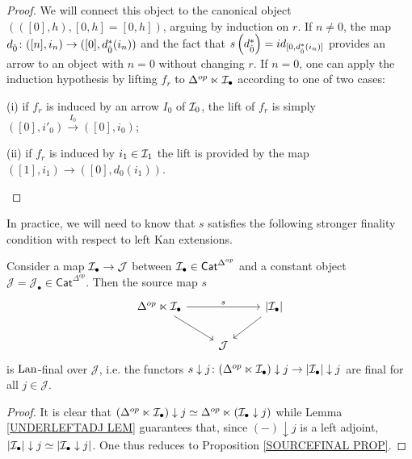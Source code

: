\documentclass[a4paper,10pt]{article}%
\begin{document}
\begin{proof}
 We will connect this object to the canonical object 
 $\left(([0],h),[0,h]=[0,h]\right)$, arguing by induction on $r$. 
If $n \neq 0$, the map 
$d_{\hat{0}} \colon ([n],i_n) \to ([0],d_{\hat{0}}^{\**}(i_n))$
 and the fact that 
$s \left(d_{\hat{0}}^{\**}\right) = id_{[0, d_{\hat{0}}^{\**}(i_n)]}$ provides an arrow to an object with $n=0$ without changing $r$.
If $n=0$, one can apply the induction hypothesis by lifting $f_r$ to $\Delta^{op} \ltimes \mathcal{I}_{\bullet}$ according to one of two cases:
\begin{inparaenum}
	\item[(i)] if $f_r$ is induced by an arrow $I_0$ of $\mathcal{I}_0$, the lift of $f_r$ is simply  
	$([0],i'_0) \xrightarrow {I_0} ([0],i_0)$;
	\item[(ii)] if $f_r$ is induced by $i_1\in \mathcal{I}_1$ the lift is provided by the map
	$([1],i_1) \to ([0],d_0(i_1))$.
\end{inparaenum}
\end{proof}


In practice, we will need to know that $s$ satisfies the following stronger finality condition with respect to left Kan extensions.


\begin{corollary}\label{SOURCELANFINAL COR}
	Consider a map
	$\mathcal{I}_{\bullet} \to \mathcal{J}$
	between $\mathcal{I}_{\bullet} \in \mathsf{Cat}^{\Delta^{op}}$
	and a constant object
	$\mathcal{J} = \mathcal{J}_{\bullet} \in \mathsf{Cat}^{\Delta^{op}}$. Then the source map $s$
\[
	\begin{tikzcd}
	\Delta^{op} \ltimes \mcI_{\bullet} \ar{rr}{s}  \ar{rd}&& \left|\mcI_{\bullet} \right|\ar{dl} \\
	& \mathcal{J}
	\end{tikzcd}	
\]
is $\operatorname{Lan}$-final over $\mathcal{J}$, i.e. the functors 
$s \downarrow j\colon (\Delta^{op} \ltimes \mathcal{I}_{\bullet})\downarrow j \to |\mathcal{I}_{\bullet}|\downarrow j$ are final for all $j\in \mathcal{J}$.
\end{corollary}

\begin{proof}
It is clear that $(\Delta^{op} \ltimes \mathcal{I}_{\bullet})\downarrow j \simeq \Delta^{op} \ltimes ( \mathcal{I}_{\bullet}\downarrow j)$
while Lemma \ref{UNDERLEFTADJ LEM}
guarantees that, since $(\minus) \downarrow j$ is a left adjoint, $|\mathcal{I}_{\bullet}|\downarrow j \simeq |\mathcal{I}_{\bullet}\downarrow j |$. One thus reduces to Proposition \ref{SOURCEFINAL PROP}.
\end{proof}
\end{document}
